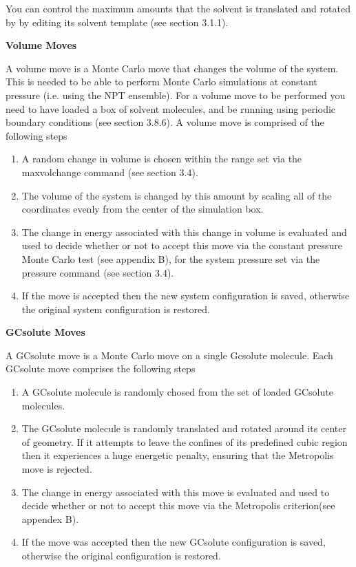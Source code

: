 \documentclass[letterpaper,10pt,english]{sphinxmanual}
\begin{document}
You can control the maximum amounts that the solvent is translated and rotated by by editing its solvent template (see section 3.1.1).

\textbf{Volume Moves}

A volume move is a Monte Carlo move that changes the volume of the system. This is needed to be able to perform Monte Carlo simulations at constant pressure (i.e. using the NPT ensemble). For a volume move to be performed you need to have loaded a box of solvent molecules, and be running using periodic boundary conditions (see
section 3.8.6). A volume move is comprised of the following steps
\begin{enumerate}
\item {} 
A random change in volume is chosen within the range set via the maxvolchange command (see section 3.4).

\item {} 
The volume of the system is changed by this amount by scaling all of the coordinates evenly from the center of the simulation box.

\item {} 
The change in energy associated with this change in volume is evaluated and used to decide whether or not to accept this move via the constant pressure Monte Carlo test (see appendix B), for the system pressure set via the pressure command (see section 3.4).

\item {} 
If the move is accepted then the new system configuration is saved, otherwise the original system configuration is restored.

\end{enumerate}

\textbf{GCsolute Moves}

A GCsolute move is a Monte Carlo move on a single Gcsolute molecule. Each GCsolute move comprises the following steps
\begin{enumerate}
\item {} 
A GCsolute molecule is randomly chosed from the set of loaded GCsolute molecules.

\item {} 
The GCsolute molecule is randomly translated and rotated around its center of geometry. If it attempts to leave the confines of its predefined cubic region then it experiences a huge energetic penalty, ensuring that the Metropolis move is rejected.

\item {} 
The change in energy associated with this move is evaluated and used to decide whether or not to accept this move via the Metropolis criterion(see appendex B).

\item {} 
If the move was accepted then the new GCsolute configuration is saved, otherwise the original configuration is restored.

\end{enumerate}
\end{document}
